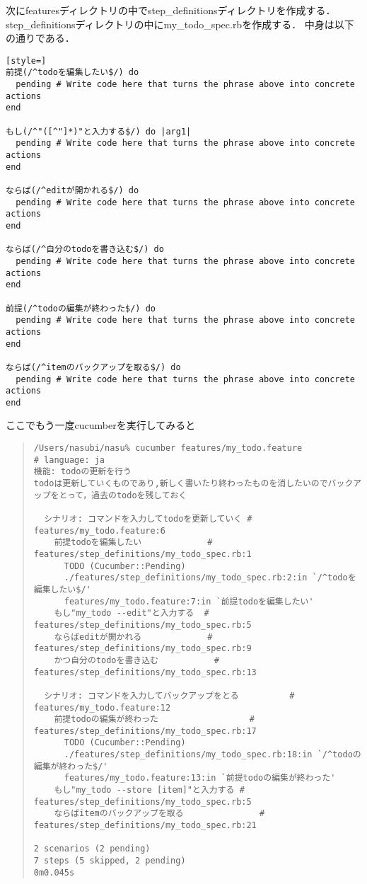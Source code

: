 次にfeaturesディレクトリの中でstep\_definitionsディレクトリを作成する．
step\_definitionsディレクトリの中にmy\_todo\_spec.rbを作成する．
中身は以下の通りである．
\begin{lstlisting}[style=]
前提(/^todoを編集したい$/) do
  pending # Write code here that turns the phrase above into concrete actions          
end

もし(/^"([^"]*)"と入力する$/) do |arg1|
  pending # Write code here that turns the phrase above into concrete actions          
end

ならば(/^editが開かれる$/) do
  pending # Write code here that turns the phrase above into concrete actions          
end

ならば(/^自分のtodoを書き込む$/) do
  pending # Write code here that turns the phrase above into concrete actions          
end

前提(/^todoの編集が終わった$/) do
  pending # Write code here that turns the phrase above into concrete actions          
end

ならば(/^itemのバックアップを取る$/) do
  pending # Write code here that turns the phrase above into concrete actions          
end

\end{lstlisting}
ここでもう一度cucumberを実行してみると
\begin{quote}\begin{verbatim}
/Users/nasubi/nasu% cucumber features/my_todo.feature 
# language: ja
機能: todoの更新を行う
todoは更新していくものであり,新しく書いたり終わったものを消したいのでバックアップをとって，過去のtodoを残しておく

  シナリオ: コマンドを入力してtodoを更新していく # features/my_todo.feature:6
    前提todoを編集したい             # features/step_definitions/my_todo_spec.rb:1
      TODO (Cucumber::Pending)
      ./features/step_definitions/my_todo_spec.rb:2:in `/^todoを編集したい$/'
      features/my_todo.feature:7:in `前提todoを編集したい'
    もし"my_todo --edit"と入力する  # features/step_definitions/my_todo_spec.rb:5
    ならばeditが開かれる             # features/step_definitions/my_todo_spec.rb:9
    かつ自分のtodoを書き込む           # features/step_definitions/my_todo_spec.rb:13

  シナリオ: コマンドを入力してバックアップをとる          # features/my_todo.feature:12
    前提todoの編集が終わった                  # features/step_definitions/my_todo_spec.rb:17
      TODO (Cucumber::Pending)
      ./features/step_definitions/my_todo_spec.rb:18:in `/^todoの編集が終わった$/'
      features/my_todo.feature:13:in `前提todoの編集が終わった'
    もし"my_todo --store [item]"と入力する # features/step_definitions/my_todo_spec.rb:5
    ならばitemのバックアップを取る               # features/step_definitions/my_todo_spec.rb:21

2 scenarios (2 pending)
7 steps (5 skipped, 2 pending)
0m0.045s

\end{verbatim}\end{quote}
